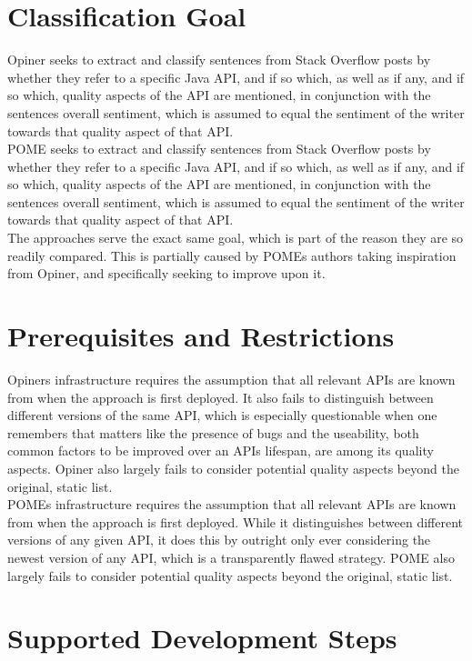 \documentclass[a4paper,10pt, bibliography=totocnumbered]{scrreprt}
\begin{document}
\section{Classification Goal}

Opiner seeks to extract and classify sentences from Stack Overflow posts by whether they refer to a specific Java API, and if so which, as well as if any, and if so which, quality aspects of the API are mentioned, in conjunction with the sentences overall sentiment, which is assumed to equal the sentiment of the writer towards that quality aspect of that API.\\
POME seeks to extract and classify sentences from Stack Overflow posts by whether they refer to a specific Java API, and if so which, as well as if any, and if so which, quality aspects of the API are mentioned, in conjunction with the sentences overall sentiment, which is assumed to equal the sentiment of the writer towards that quality aspect of that API.\\
The approaches serve the exact same goal, which is part of the  reason they are so readily compared. This is partially caused by POMEs authors taking inspiration from Opiner, and specifically seeking to improve upon it.

\section{Prerequisites and Restrictions}

Opiners infrastructure requires the assumption that all relevant APIs are known from when the approach is first deployed. It also fails to distinguish between different versions of the same API, which is especially questionable when one remembers that matters like the presence of bugs and the useability, both common factors to be improved over an APIs lifespan, are among its quality aspects. Opiner also largely fails to consider potential quality aspects beyond the original, static list.\\
POMEs infrastructure requires the assumption that all relevant APIs are known from when the approach is first deployed. While it distinguishes between different versions of any given API, it does this by outright only ever considering the newest version of any API, which is a transparently flawed strategy. POME also largely fails to consider potential quality aspects beyond the original, static list.

\pagebreak

\section{Supported Development Steps}
\end{document}
